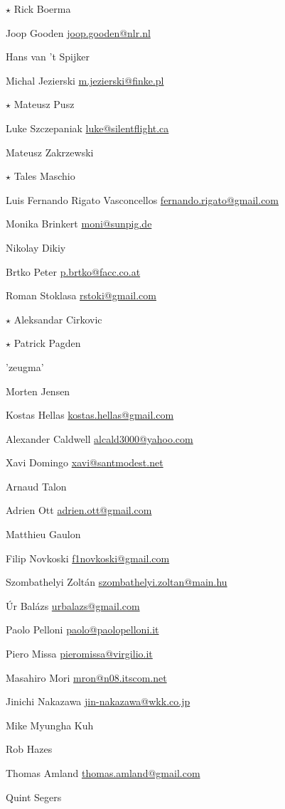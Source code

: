 \begin{compactitem}
\item$\star$  Rick Boerma
\item Joop Gooden \url{joop.gooden@nlr.nl}
\item Hans van 't Spijker
\item Michal Jezierski \url{m.jezierski@finke.pl}
\item$\star$  Mateusz Pusz
\item Luke Szczepaniak \url{luke@silentflight.ca}
\item Mateusz Zakrzewski
\item$\star$  Tales Maschio
\item Luis Fernando Rigato Vasconcellos \url{fernando.rigato@gmail.com}
\item Monika Brinkert \url{moni@sunpig.de}
\item Nikolay Dikiy
\item Brtko Peter \url{p.brtko@facc.co.at}
\item Roman Stoklasa \url{rstoki@gmail.com}
\item$\star$  Aleksandar Cirkovic
\item$\star$  Patrick Pagden
\item 'zeugma'
\item Morten Jensen
\item Kostas Hellas \url{kostas.hellas@gmail.com}
\item Alexander Caldwell \url{alcald3000@yahoo.com}
\item Xavi Domingo \url{xavi@santmodest.net}
\item Arnaud Talon
\item Adrien Ott \url{adrien.ott@gmail.com}
\item Matthieu Gaulon
\item Filip Novkoski \url{f1novkoski@gmail.com}
\item Szombathelyi Zolt\'an \url{szombathelyi.zoltan@main.hu}
\item \'Ur Bal\'azs \url{urbalazs@gmail.com}
\item Paolo Pelloni \url{paolo@paolopelloni.it}
\item Piero Missa \url{pieromissa@virgilio.it}
\item Masahiro Mori \url{mron@n08.itscom.net}
\item Jinichi Nakazawa \url{jin-nakazawa@wkk.co.jp}
\item Mike Myungha Kuh
\item Rob Hazes
\item Thomas Amland \url{thomas.amland@gmail.com}
\item Quint Segers

\end{compactitem}
